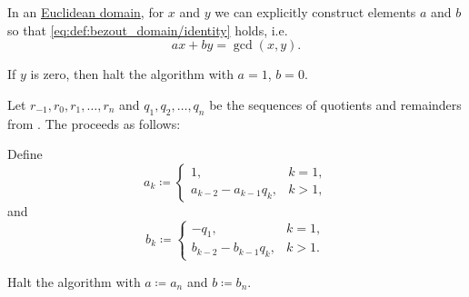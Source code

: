 \begin{algorithm}\label{alg:extended_euclidean_algorithm}
  In an \hyperref[def:euclidean_domain]{Euclidean domain}, for \( x \) and \( y \) we can explicitly construct elements \( a \) and \( b \) so that \eqref{eq:def:bezout_domain/identity} holds, i.e.
  \begin{equation*}
    ax + by = \gcd(x, y).
  \end{equation*}

  \begin{thmenum}
     If \( y \) is zero, then halt the algorithm with \( a = 1 \), \( b = 0 \).

     Let \( r_{-1}, r_0, r_1, \ldots, r_n \) and \( q_1, q_2, \ldots, q_n \) be the sequences of quotients and remainders from . The  proceeds as follows:

    Define
    \begin{equation*}
      a_k \coloneqq \begin{cases}
        1,                     &k = 1, \\
        a_{k-2} - a_{k-1} q_k, &k > 1,
      \end{cases}
    \end{equation*}
    and
    \begin{equation*}
      b_k \coloneqq \begin{cases}
        -q_1,                  &k = 1, \\
        b_{k-2} - b_{k-1} q_k, &k > 1.
      \end{cases}
    \end{equation*}

    Halt the algorithm with \( a \coloneqq a_n \) and \( b \coloneqq b_n \).
  \end{thmenum}
\end{algorithm}
